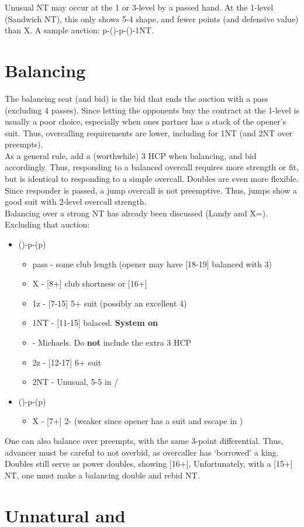 \documentclass[12pt]{report}
\newcommand{\n}{\\}
\newcommand{\q}[1]{\multido{}{#1}{\qquad}}
\newcommand{\ul}[1]{\begin{itemize}#1\end{itemize}}
\newcommand{\li}[1]{\item[~] \q{#1}}
\newcommand{\bidsection}[2]{\section{\texorpdfstring{#1}{#2}}}
\begin{document}
    Unusual NT may occur at the 1 or 3-level by a passed hand.  At the 1-level (Sandwich NT), this only shows 5-4 shape, and fewer points (and defensive value) than X.  A sample auction: p-()-p-()-1NT.

\section{Balancing} \label{4:7}

    The balancing seat (and bid) is the bid that ends the auction with a pass (excluding 4 passes).  Since letting the opponents buy the contract at the 1-level is usually a poor choice, especially when ones partner has a stack of the opener's suit.  Thus, overcalling requirements are lower, including for 1NT (and 2NT over preempts). \n

    As a general rule, add a (worthwhile) 3 HCP when balancing, and bid accordingly.  Thus, responding to a balanced overcall requires more strength or fit, but is identical to responding to a simple overcall.  Doubles are even more flexible. \n
    
    Since responder is passed, a jump overcall is not preemptive.  Thus, jumps show a good suit with 2-level overcall strength. \n

    Balancing over a strong NT has already been discussed (Landy and X=\cl{}).  Excluding that auction:

    \ul{
        \li0 ()-p-(p) \ul{
            \li0 pass - some club length (opener may have [18-19] balanced with 3\cl{})
            \li0 X - [8+] club shortness or [16+]
            \li0 1z - [7-15] 5+ suit (possibly an excellent 4)
            \li0 1NT - [11-15] balaced.  \textbf{System on}
            \li0 \cl2 - Michaels.  Do \textbf{not} include the extra 3 HCP
            \li0 2z - [12-17] 6+ suit
            \li0 2NT - Unusual, 5-5 in \di{}/\he{}
        }

        \li0 (\he1)-p-(p) \ul{
            \li0 X - [7+] 2-\he{} (weaker since opener has a suit and escape in \sp1)
        }
    }

    One can also balance over preempts, with the same 3-point differential. Thus, advancer must be careful to not overbid, as overcaller has `borrowed' a king. \n
    
    Doubles still serve as power doubles, showing [16+], Unfortunately, with a [15+] NT, one must make a balancing double and rebid NT.

\bidsection{Unnatural  and }{Unnatural 1♣ and 1♢}\label{4:8}
\end{document}
